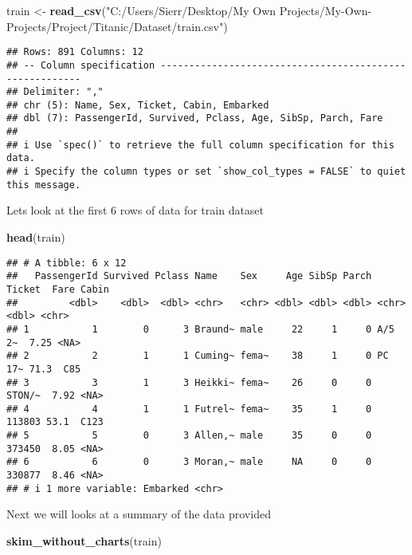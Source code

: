 \documentclass[
]{article}
\newenvironment{Shaded}{\begin{snugshade}}{\end{snugshade}}
\newcommand{\FunctionTok}[1]{\textcolor[rgb]{0.13,0.29,0.53}{\textbf{#1}}}
\newcommand{\NormalTok}[1]{#1}
\newcommand{\OtherTok}[1]{\textcolor[rgb]{0.56,0.35,0.01}{#1}}
\newcommand{\StringTok}[1]{\textcolor[rgb]{0.31,0.60,0.02}{#1}}
\begin{document}
\begin{Shaded}
\begin{Highlighting}[]
\NormalTok{train }\OtherTok{\textless{}{-}} \FunctionTok{read\_csv}\NormalTok{(}\StringTok{"C:/Users/Sierr/Desktop/My Own Projects/My{-}Own{-}Projects/Project/Titanic/Dataset/train.csv"}\NormalTok{)}
\end{Highlighting}
\end{Shaded}

\begin{verbatim}
## Rows: 891 Columns: 12
## -- Column specification --------------------------------------------------------
## Delimiter: ","
## chr (5): Name, Sex, Ticket, Cabin, Embarked
## dbl (7): PassengerId, Survived, Pclass, Age, SibSp, Parch, Fare
## 
## i Use `spec()` to retrieve the full column specification for this data.
## i Specify the column types or set `show_col_types = FALSE` to quiet this message.
\end{verbatim}

Lets look at the first 6 rows of data for train dataset

\begin{Shaded}
\begin{Highlighting}[]
\FunctionTok{head}\NormalTok{(train)}
\end{Highlighting}
\end{Shaded}

\begin{verbatim}
## # A tibble: 6 x 12
##   PassengerId Survived Pclass Name    Sex     Age SibSp Parch Ticket  Fare Cabin
##         <dbl>    <dbl>  <dbl> <chr>   <chr> <dbl> <dbl> <dbl> <chr>  <dbl> <chr>
## 1           1        0      3 Braund~ male     22     1     0 A/5 2~  7.25 <NA> 
## 2           2        1      1 Cuming~ fema~    38     1     0 PC 17~ 71.3  C85  
## 3           3        1      3 Heikki~ fema~    26     0     0 STON/~  7.92 <NA> 
## 4           4        1      1 Futrel~ fema~    35     1     0 113803 53.1  C123 
## 5           5        0      3 Allen,~ male     35     0     0 373450  8.05 <NA> 
## 6           6        0      3 Moran,~ male     NA     0     0 330877  8.46 <NA> 
## # i 1 more variable: Embarked <chr>
\end{verbatim}

Next we will looks at a summary of the data provided

\begin{Shaded}
\begin{Highlighting}[]
\FunctionTok{skim\_without\_charts}\NormalTok{(train)}
\end{Highlighting}
\end{Shaded}
\end{document}
